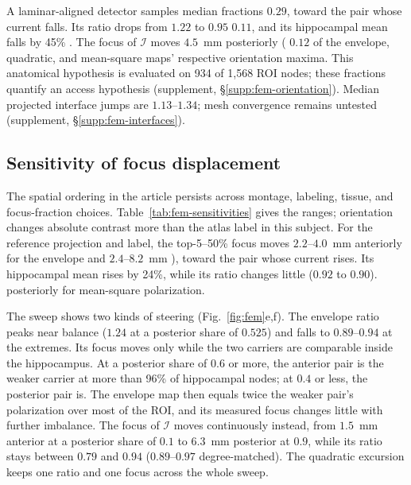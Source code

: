 \documentclass[11pt,a4paper]{article}
\newif\ifjne
\providecommand{\DIFaddtex}[1]{{\protect\color{blue} \sf #1}} %
\providecommand{\DIFdeltex}[1]{{\protect\color{red} \scriptsize #1}} %
\providecommand{\DIFaddbegin}{} %
\providecommand{\DIFaddend}{} %
\providecommand{\DIFdelbegin}{} %
\providecommand{\DIFdelend}{} %
\providecommand{\DIFadd}[1]{\texorpdfstring{\DIFaddtex{#1}}{#1}} %
\providecommand{\DIFdel}[1]{\texorpdfstring{\DIFdeltex{#1}}{}} %
\begin{document}
\DIFadd{A laminar-aligned detector samples median fractions $0.29$}\DIFaddend , \DIFdelbegin \DIFdel{toward the pair whose
current falls.
Its ratio drops from $1.22$ to $0.95$}\DIFdelend \DIFaddbegin \DIFadd{$0.11$}\DIFaddend , and \DIFdelbegin \DIFdel{its hippocampal mean falls by
45\% . The focus of $\mathcal I$ moves
$4.5$~mm posteriorly (}\DIFdelend \DIFaddbegin \DIFadd{$0.12$
of the envelope, quadratic, and mean-square maps' respective orientation
maxima. This anatomical hypothesis is evaluated on 934 of 1,568 ROI nodes;
these fractions quantify an access hypothesis (supplement, \S\ref{supp:fem-orientation}).
Median projected interface jumps are $1.13$--$1.34$; mesh convergence remains untested (supplement, \S\ref{supp:fem-interfaces}).
}\ifjne\else
\subsection{\DIFadd{Sensitivity of focus displacement}}\label{supp:fem-sensitivities}
\DIFadd{The spatial ordering in the article persists across montage, labeling, tissue,
and focus-fraction choices. Table~\ref{tab:fem-sensitivities} gives the ranges;
orientation changes absolute contrast more than the atlas label in this subject.
For the reference projection and label, the top-5--50\% focus moves
$2.2$--$4.0$~mm anteriorly for the envelope and }\DIFaddend $2.4$--$8.2$~mm \DIFdelbegin \DIFdel{), toward
the pair whose current rises.
Its hippocampal mean rises by 24\%, while its ratio
changes little ($0.92$ to $0.90$).
}\DIFdelend \DIFaddbegin \DIFadd{posteriorly
for mean-square polarization.
}\DIFaddend

The sweep shows two kinds of steering (Fig.~\ref{fig:fem}e,f). The envelope ratio peaks
near balance ($1.24$ at a posterior share of $0.525$) and falls to $0.89$--$0.94$ at
the extremes. Its focus moves only while the two carriers are comparable inside the
hippocampus. At a posterior share of $0.6$ or more, the anterior pair is the weaker
carrier at more than 96\% of hippocampal nodes; at $0.4$ or less, the posterior pair is. The
envelope map then equals twice the weaker pair's polarization over most of the ROI,
and its measured focus changes little with further imbalance. The focus of $\mathcal I$ moves
continuously instead, from $1.5$~mm anterior at a posterior share of $0.1$ to $6.3$~mm
posterior at $0.9$, while its ratio stays between $0.79$ and $0.94$ ($0.89$--$0.97$
degree-matched). The quadratic excursion keeps one ratio and one focus across the
whole sweep.
\end{document}
